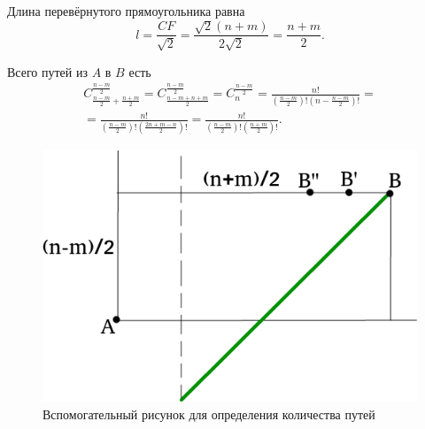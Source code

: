 \documentclass{book}
\begin{document}
Длина перевёрнутого прямоугольника равна
$$l =
\frac{CF}{ \sqrt{2} } =
\frac{ \sqrt{2} \left( n+m \right) }{2 \sqrt{2} } =
\frac{n+m}{2}.$$

Всего путей из $A$ в $B$ есть
\begin{equation*}
\begin{split}
C_{ \frac{n-m}{2} + \frac{n+m}{2} }^{ \frac{n-m}{2} } =
C_{ \frac{n-m+n+m}{2} }^{ \frac{n-m}{2} } =
C_n^{ \frac{n-m}{2} } =
\frac{n!}{ \left( \frac{n-m}{2} \right)! \left( n - \frac{n-m}{2} \right)! } = \\
= \frac{n!}{ \left( \frac{n-m}{2} \right)! \left( \frac{2n+m-n}{2} \right)!} =
\frac{n!}{ \left( \frac{n-m}{2} \right)! \left( \frac{n+m}{2} \right)!}. 
\end{split}
\end{equation*}

\begin{figure}[h!]
  \centering
  \includegraphics[width=.6\textwidth]{./pictures/4_22_9.png}
  \caption{Вспомогательный рисунок для определения количества путей}
  \label{fig:4229}
\end{figure}
\end{document}
